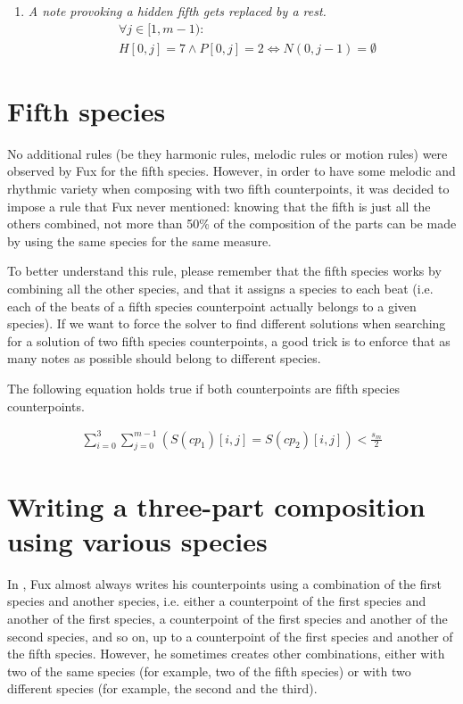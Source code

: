 \begin{enumerate}[wide, label=\bfseries 4.P\arabic*]
    \item \textit{A note provoking a hidden fifth gets replaced by a rest.} \label{constraint:hidden-fifths}
    \begin{equation}
        \begin{aligned}
            &\forall j \in [1, m-1):\\
            &H[0, j] = 7 \land P[0,j] = 2 \iff N(0, j-1) = \emptyset  
        \end{aligned}
    \end{equation}


\end{enumerate}

\section{Fifth species}
No additional rules (be they harmonic rules, melodic rules or motion rules) were observed by Fux for the fifth species.
However, in order to have some melodic and rhythmic variety when composing with two fifth counterpoints, it was decided to impose a rule that Fux never mentioned: knowing that the fifth is just all the others combined, not more than 50\% of the composition of the parts can be made by using the same species for the same measure.


To better understand this rule, please remember that the fifth species works by combining all the other species, and that it assigns a species to each beat (i.e. each of the beats of a fifth species counterpoint actually belongs to a given species). If we want to force the solver to find different solutions when searching for a solution of two fifth species counterpoints, a good trick is to enforce that as many notes as possible should belong to different species.

The following equation holds true if both counterpoints are fifth species counterpoints.


\begin{equation}
\begin{aligned}
\sum_{i=0}^{3} \sum_{j=0}^{m-1} (S(cp_1)[i,j] = S(cp_2)[i,j]) < \frac{s_m}{2}
\end{aligned}
\end{equation}

\section{Writing a three-part composition using various species}
In \gap, Fux almost always writes his counterpoints using a combination of the first species and another species, i.e. either a counterpoint of the first species and another of the first species, a counterpoint of the first species and another of the second species, and so on, up to a counterpoint of the first species and another of the fifth species. However, he sometimes creates other combinations, either with two of the same species (for example, two of the fifth species) or with two different species (for example, the second and the third).

